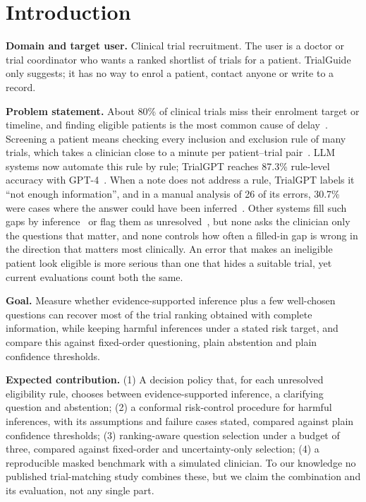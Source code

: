 \documentclass[10pt,a4paper]{article}
\begin{document}
\section{Introduction}
\textbf{Domain and target user.} Clinical trial recruitment. The user is a doctor or trial coordinator who wants a ranked shortlist of trials for a patient. TrialGuide only suggests; it has no way to enrol a patient, contact anyone or write to a record.

\textbf{Problem statement.} About 80\% of clinical trials miss their enrolment target or timeline, and finding eligible patients is the most common cause of delay~\cite{jmir}. Screening a patient means checking every inclusion and exclusion rule of many trials, which takes a clinician close to a minute per patient--trial pair~\cite{trialgpt}. LLM systems now automate this rule by rule; TrialGPT reaches 87.3\% rule-level accuracy with GPT-4~\cite{trialgpt}. When a note does not address a rule, TrialGPT labels it ``not enough information'', and in a manual analysis of 26 of its errors, 30.7\% were cases where the answer could have been inferred~\cite{trialgpt}. Other systems fill such gaps by inference~\cite{anesy} or flag them as unresolved~\cite{verdict}, but none asks the clinician only the questions that matter, and none controls how often a filled-in gap is wrong in the direction that matters most clinically. An error that makes an ineligible patient look eligible is more serious than one that hides a suitable trial, yet current evaluations count both the same.

\textbf{Goal.} Measure whether evidence-supported inference plus a few well-chosen questions can recover most of the trial ranking obtained with complete information, while keeping harmful inferences under a stated risk target, and compare this against fixed-order questioning, plain abstention and plain confidence thresholds.

\textbf{Expected contribution.} (1) A decision policy that, for each unresolved eligibility rule, chooses between evidence-supported inference, a clarifying question and abstention; (2) a conformal risk-control procedure for harmful inferences, with its assumptions and failure cases stated, compared against plain confidence thresholds; (3) ranking-aware question selection under a budget of three, compared against fixed-order and uncertainty-only selection; (4) a reproducible masked benchmark with a simulated clinician. To our knowledge no published trial-matching study combines these, but we claim the combination and its evaluation, not any single part.
\end{document}

